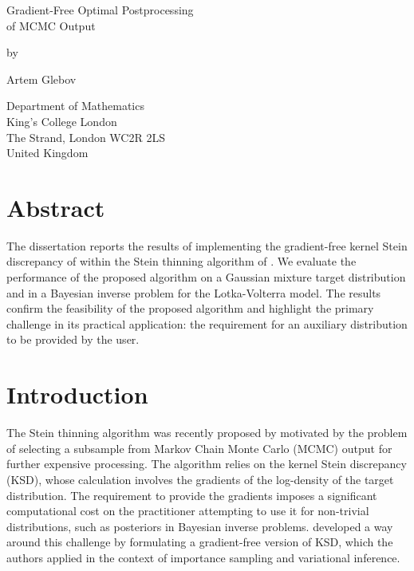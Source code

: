 \documentclass[11pt,a4paper]{report}
\date{}
\begin{document}
%


\thispagestyle{empty}
\begin{center}
{\huge
Gradient-Free Optimal Postprocessing \\
of MCMC Output

\bigskip
\bigskip

by
\bigskip
\bigskip

Artem Glebov
}
\end{center}
\vfill

\begin{center}
{\large
Department of Mathematics\\
King's College London\\
The Strand, London WC2R 2LS\\
United Kingdom\\
\medskip

}
\end{center}
\bigskip


\newpage
\setcounter{page}{1}
\restoregeometry

\chapter*{Abstract}

The dissertation reports the results of implementing the gradient-free kernel Stein discrepancy of \cite{fisherGradientFreeKernelStein2024} within the Stein thinning algorithm of \cite{riabizOptimalThinningMCMC2022}. We evaluate the performance of the proposed algorithm on a Gaussian mixture target distribution and in a Bayesian inverse problem for the Lotka-Volterra model. The results confirm the feasibility of the proposed algorithm and highlight the primary challenge in its practical application: the requirement for an auxiliary distribution to be provided by the user.


\tableofcontents


\chapter*{Introduction}

The Stein thinning algorithm was recently proposed by \cite{riabizOptimalThinningMCMC2022} motivated by the problem of selecting a subsample from Markov Chain Monte Carlo (MCMC) output for further expensive processing. The algorithm relies on the kernel Stein discrepancy (KSD), whose calculation involves the gradients of the log-density of the target distribution. The requirement to provide the gradients imposes a significant computational cost on the practitioner attempting to use it for non-trivial distributions, such as posteriors in Bayesian inverse problems. \cite{fisherGradientFreeKernelStein2024} developed a way around this challenge by formulating a gradient-free version of KSD, which the authors applied in the context of importance sampling and variational inference.
\end{document}
